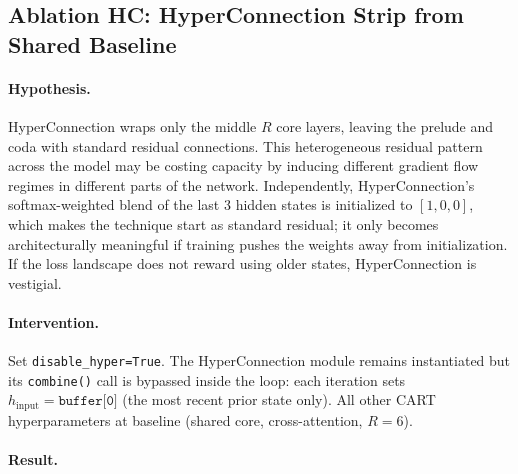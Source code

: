 \documentclass{article}
\begin{document}
\subsection{Ablation HC: HyperConnection Strip from Shared Baseline}
\label{sec:abl_hc}

\paragraph{Hypothesis.}
HyperConnection wraps only the middle $R$ core layers, leaving the prelude and coda with standard residual connections. This heterogeneous residual pattern across the model may be costing capacity by inducing different gradient flow regimes in different parts of the network. Independently, HyperConnection's softmax-weighted blend of the last 3 hidden states is initialized to $[1, 0, 0]$, which makes the technique start as standard residual; it only becomes architecturally meaningful if training pushes the weights away from initialization. If the loss landscape does not reward using older states, HyperConnection is vestigial.

\paragraph{Intervention.}
Set \texttt{disable\_hyper=True}. The HyperConnection module remains instantiated but its \texttt{combine()} call is bypassed inside the loop: each iteration sets $h_\text{input} = \texttt{buffer[0]}$ (the most recent prior state only). All other CART hyperparameters at baseline (shared core, cross-attention, $R{=}6$).

\paragraph{Result.}
\end{document}

